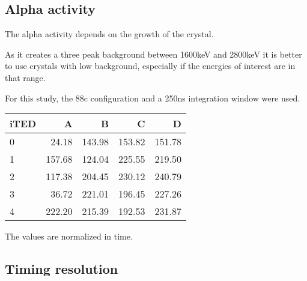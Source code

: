 \subsection{Alpha activity}\label{ssec:alpha}

The alpha activity depends on the growth of the crystal.

As it creates a three peak background between 1600keV and 2800keV it is better to use crystals with low background, especially if the energies of interest are in that range.

For this study, the 88c configuration and a 250ns integration window were used.

\begin{tabular}{lrrrr}
    \toprule
    iTED &    A  &      B &     C  &     D \\
    \midrule
    0    & 24.18 & 143.98 & 153.82 &151.78 \\
    1    &157.68 & 124.04 & 225.55 &219.50 \\
    2    &117.38 & 204.45 & 230.12 &240.79 \\
    3    & 36.72 & 221.01 & 196.45 &227.26 \\
    4    &222.20 & 215.39 & 192.53 &231.87 \\
    \bottomrule
\end{tabular}

The values are normalized in time.

\subsection{Timing resolution}
